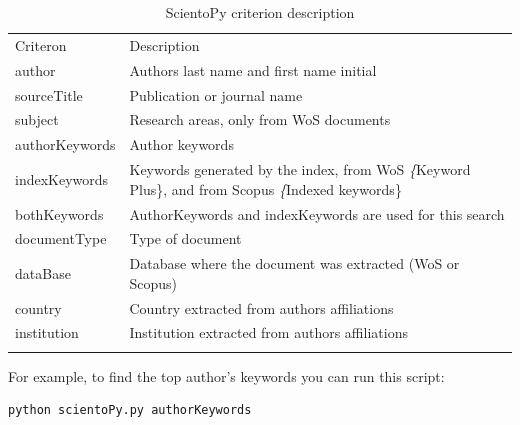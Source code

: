 \documentclass[10pt,letterpaper]{article}
\begin{document}
\begin{table}[h]
	\centering
	\caption{ScientoPy criterion description}
	\label{table_criterion}
	
	
	\begin{tabular}{ p{3cm} p{10cm}}
	\hline\noalign{\smallskip}
	Criteron       & Description                             \\
	\noalign{\smallskip}\hline\noalign{\smallskip}                                                                         
	author        & Authors last name and first name initial                                                                       \\
	sourceTitle    & Publication or journal name                                                                                    \\
	subject        & Research areas, only from WoS documents                                                                        \\
	authorKeywords & Author keywords                                                                                                \\
	indexKeywords  & Keywords generated by the index, from WoS \textit\{Keyword Plus\}, and from Scopus \textit\{Indexed keywords\} \\
	bothKeywords   & AuthorKeywords and indexKeywords are used for this search                                                      \\
	documentType   & Type of document                                                                                               \\
	dataBase       & Database where the document was extracted (WoS or Scopus)                                                      \\
	country        & Country extracted from authors affiliations                                                                    \\
	institution    & Institution extracted from authors affiliations                                                                \\
	\noalign{\smallskip}\hline
	\end{tabular}
	
\end{table}

For example, to find the top author's keywords you can run this script: 

\begin{verbatim}
python scientoPy.py authorKeywords
\end{verbatim}
\end{document}
